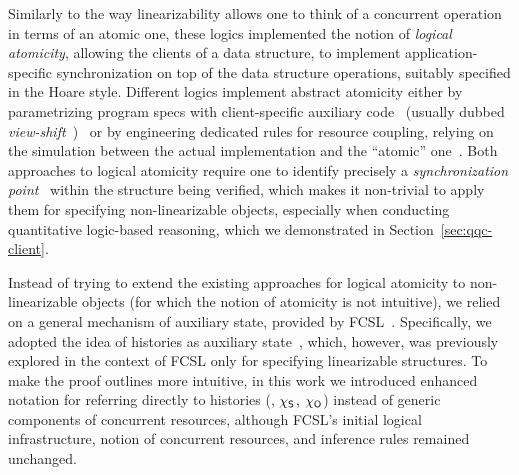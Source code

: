 Similarly to the way linearizability allows one to think of a
concurrent operation in terms of an atomic one, these logics implemented the
notion of \emph{logical atomicity}, allowing the clients of a data
structure, to implement application-specific synchronization on top of
the data structure operations, suitably specified in the Hoare style.
%
Different logics implement abstract atomicity either by parametrizing
program specs with client-specific auxiliary
code~\cite{Jacobs-Piessens:POPL11} (usually dubbed
\emph{view-shift}~\cite{DinsdaleYoung-al:POPL13})~\cite{Svendsen-al:ESOP13,Svendsen-Birkedal:ESOP14,Jung-al:POPL15}
or by engineering dedicated rules for resource coupling, relying on
the simulation between the actual implementation and the ``atomic''
one~\cite{ArrozPincho-al:ECOOP14}.
%
Both approaches to logical atomicity require one to identify precisely
a \emph{synchronization point}~\cite{Svendsen-al:ESOP13} within the
structure being verified, which makes it non-trivial to apply them for
specifying non-linearizable objects, especially when conducting
quantitative logic-based reasoning, which we demonstrated in
Section~\ref{sec:qqc-client}.

Instead of trying to extend the existing approaches for logical
atomicity to non-linearizable objects (for which the notion of
atomicity is not intuitive), we relied on a general mechanism of
auxiliary state, provided by FCSL~\cite{Nanevski-al:ESOP14}. 
%
Specifically, we adopted the idea of histories as auxiliary
state~\cite{Sergey-al:ESOP15}, which, however, was previously explored
in the context of FCSL only for specifying linearizable structures.
%
%
% 
To make the proof outlines more intuitive, in this work we introduced
enhanced notation for referring directly to histories (\eg, $\chi_{\mathsf{S}}$,
$\chi_{\mathsf{O}}$) instead of generic components of concurrent resources,
although FCSL's initial logical infrastructure, notion of concurrent
resources, and inference rules remained unchanged.









